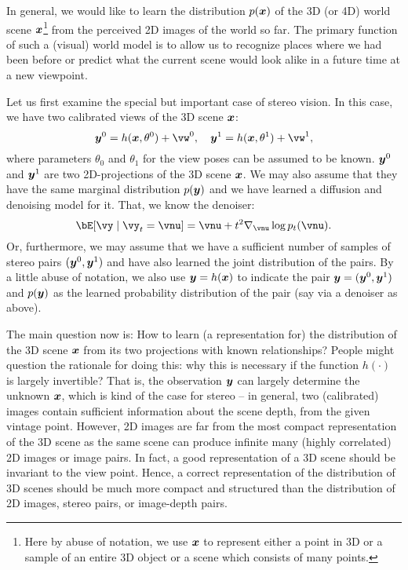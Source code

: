 \documentclass[../../book-main.tex]{subfiles}
\begin{document}
In general, we would like to learn the distribution $p(\bm{x})$ of the 3D (or 4D) world scene $\bm{x}$\footnote{Here by abuse of notation, we use $\bm{x}$ to represent either a point in 3D or a sample of an entire 3D object or a scene which consists of many points.} from the perceived 2D images of the world so far. The primary function of such a (visual) world model is to allow us to recognize places where we had been before or predict what the current scene would look alike in a future time at a new viewpoint. 

Let us first examine the special but important case of stereo vision. In this case, we have two calibrated views of the 3D scene $\bm{x}$:
\begin{equation}
    \y^0 = h(\x, \theta^0) +\vw^0, \quad \y^1 = h(\x, \theta^1) +\vw^1, 
\end{equation}
where parameters $\theta_0$ and $\theta_1$ for the view poses can be assumed to be known. $\bm{y}^0$ and $\bm{y}^1$ are two 2D-projections of the 3D scene $\bm{x}$. We may also assume that they have the same marginal distribution $p(\bm{y})$ and we have learned a diffusion and denoising model for it. That, we know the denoiser:
\begin{equation}
  \bE[\vy \mid \vy_t=\vnu] =
  \vnu + t^2 \nabla_{\vnu}\log p_t(\vnu). 
 \label{eq:y-posterior-sampling-denoiser}    
\end{equation}
Or, furthermore, we may assume that we have a sufficient number of samples of stereo pairs $(\bm{y}^0, \bm{y}^1)$ and have also learned the joint distribution of the pairs. By a little abuse of notation, we also use $\bm{y} = h(\bm{x})$ to indicate the pair $\bm{y} = (\bm{y}^0, \bm{y}^1)$ and $p(\bm{y})$ as the learned probability distribution of the pair (say via a denoiser as above).  

The main question now is: How to learn (a representation for) the distribution of the 3D scene $\bm{x}$ from its two projections with known relationships? 
People might question the rationale for doing this: why this is necessary if the function $h(\cdot)$ is largely invertible? That is, the observation $\bm{y}$ can largely determine the unknown $\bm{x}$, which is kind of the case for stereo -- in general, two (calibrated) images contain sufficient information about the scene depth, from the given vintage point. However, 2D images are far from the most compact representation of the 3D scene as the same scene can produce infinite many (highly correlated) 2D images or image pairs. In fact, a good representation of a 3D scene should be invariant to the view point. Hence, a correct representation of the distribution of 3D scenes should be much more compact and structured than the distribution of 2D images, stereo pairs, or image-depth pairs. 
\end{document}
